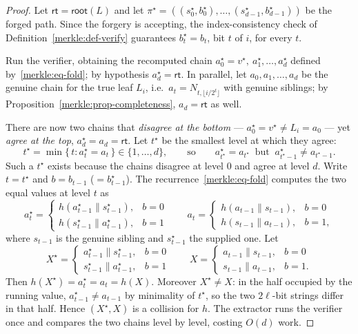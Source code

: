 \documentclass[11pt,a4paper]{article}
\theoremstyle{definition}
\theoremstyle{remark}
\begin{document}
\begin{proof}
Let \(\mathsf{rt} = \mathsf{root}(L)\) and let \(\pi^\star = ((s_0^\star, b_0^\star), \dots, (s_{d-1}^\star, b_{d-1}^\star))\) be the forged path. Since the forgery is accepting, the index-consistency check of Definition~\ref{merkle:def-verify} guarantees \(b_t^\star = b_t\), bit \(t\) of \(i\), for every \(t\).

Run the verifier, obtaining the recomputed chain \(a_0^\star = v^\star,\ a_1^\star, \dots, a_d^\star\) defined by~\eqref{merkle:eq-fold}; by hypothesis \(a_d^\star = \mathsf{rt}\). In parallel, let \(a_0, a_1, \dots, a_d\) be the genuine chain for the true leaf \(L_i\), i.e.\ \(a_t = N_{t, \lfloor i/2^t\rfloor}\) with genuine siblings; by Proposition~\ref{merkle:prop-completeness}, \(a_d = \mathsf{rt}\) as well.

There are now two chains that \emph{disagree at the bottom} --- \(a_0^\star = v^\star \neq L_i = a_0\) --- yet \emph{agree at the top}, \(a_d^\star = a_d = \mathsf{rt}\). Let \(t^\star\) be the smallest level at which they agree:
\[
t^\star = \min\{\, t : a_t^\star = a_t \,\} \in \{1, \dots, d\},
\qquad\text{so}\qquad a_{t^\star}^\star = a_{t^\star} \ \text{ but } \ a_{t^\star - 1}^\star \neq a_{t^\star - 1}.
\]
Such a \(t^\star\) exists because the chains disagree at level \(0\) and agree at level \(d\). Write \(t = t^\star\) and \(b = b_{t-1}\) (\(= b_{t-1}^\star\)). The recurrence~\eqref{merkle:eq-fold} computes the two equal values at level \(t\) as
\[
a_{t}^\star =
\begin{cases}
h(a_{t-1}^\star \| s_{t-1}^\star), & b = 0\\
h(s_{t-1}^\star \| a_{t-1}^\star), & b = 1
\end{cases}
\qquad
a_{t} =
\begin{cases}
h(a_{t-1} \| s_{t-1}), & b = 0\\
h(s_{t-1} \| a_{t-1}), & b = 1,
\end{cases}
\]
where \(s_{t-1}\) is the genuine sibling and \(s_{t-1}^\star\) the supplied one. Let
\[
X^\star = \begin{cases} a_{t-1}^\star \| s_{t-1}^\star, & b=0\\ s_{t-1}^\star \| a_{t-1}^\star, & b=1\end{cases}
\qquad
X = \begin{cases} a_{t-1} \| s_{t-1}, & b=0\\ s_{t-1} \| a_{t-1}, & b=1.\end{cases}
\]
Then \(h(X^\star) = a_t^\star = a_t = h(X)\). Moreover \(X^\star \neq X\): in the half occupied by the running value, \(a_{t-1}^\star \neq a_{t-1}\) by minimality of \(t^\star\), so the two \(2\ell\)-bit strings differ in that half. Hence \((X^\star, X)\) is a collision for \(h\). The extractor runs the verifier once and compares the two chains level by level, costing \(O(d)\) work.


\end{proof}
\end{document}
